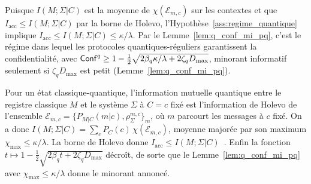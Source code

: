 \begin{sloppypar}
\begin{remark}
\label{rem:statut_regime_quantique}
Puisque $I(M;\Sigma|C)$ est la moyenne de $\chi(\mathcal{E}_{m,c})$ sur
les contextes et que $I_{\mathrm{acc}} \leq I(M;\Sigma|C)$ par la borne de
Holevo, l'Hypoth\`ese~\ref{ass:regime_quantique} implique
$I_{\mathrm{acc}} \leq I(M;\Sigma|C) \leq \kappa/\lambda$. Par le
Lemme~\ref{lem:q_conf_mi_pq}, c'est le r\'egime dans lequel les
protocoles quantiques-r\'eguliers garantissent la confidentialit\'e, avec
$\mathsf{Conf}^q \geq 1 - \frac{1}{2}\sqrt{2\beta_q \kappa/\lambda + 2\zeta_q
D_{\max}}$, minorant informatif seulement si $\zeta_q D_{\max}$ est petit
(Lemme~\ref{lem:q_conf_mi_pq}).
\end{remark}

\begin{Preuve}
Pour un \'etat classique-quantique, l'information mutuelle quantique entre le
registre classique $M$ et le syst\`eme $\Sigma$ \`a $C = c$ fix\'e est l'information
de Holevo de l'ensemble $\mathcal{E}_{m,c} = \{P_{M|C}(m|c), \rho_\Sigma^{m,c}\}_m$, o\`u $m$ parcourt les messages \`a $c$ fix\'e.
On a donc $I(M;\Sigma|C) = \sum_c P_C(c)\,\chi(\mathcal{E}_{m,c})$, moyenne major\'ee
par son maximum $\chi_{\max} \leq \kappa/\lambda$. La borne de Holevo donne
$I_{\mathrm{acc}} \leq I(M;\Sigma|C)$~\cite{Holevo1973}. Enfin la fonction
$t \mapsto 1 - \tfrac12\sqrt{2\beta_q t + 2\zeta_q D_{\max}}$ d\'ecro\^it, de sorte
que le Lemme~\ref{lem:q_conf_mi_pq} avec $\chi_{\max} \leq \kappa/\lambda$ donne le
minorant annonc\'e.
\end{Preuve}
\end{sloppypar}


